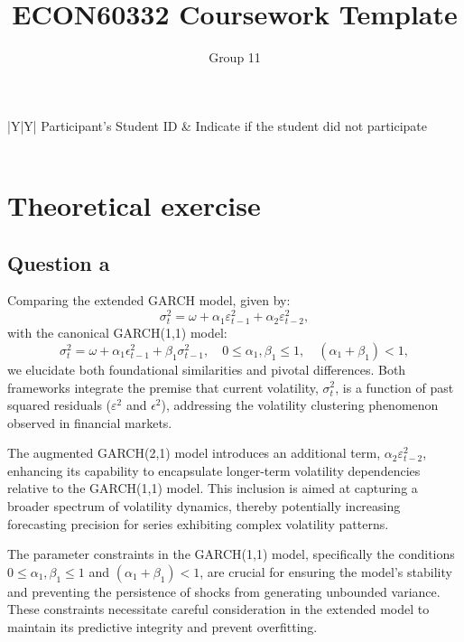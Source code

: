 \documentclass{article}
\title{ECON60332 Coursework Template}
\author{Group 11} %
\date{}
\begin{document}
\maketitle

\noindent\begin{tabularx}{\linewidth}{|Y|Y|}
    \hline
     Participant’s Student ID & Indicate if the student did not participate \\
    \hline
    \\
    \hline

\end{tabularx}

\section*{Theoretical exercise}

\subsection*{Question a}

Comparing the extended GARCH model, given by:
\begin{equation}
\sigma_t^2 = \omega + \alpha_1 \varepsilon_{t-1}^2 + \alpha_2 \varepsilon_{t-2}^2,
\end{equation}
with the canonical GARCH(1,1) model:
\begin{equation}
\sigma^2_{t} = \omega + \alpha_1 \epsilon^2_{t-1} + \beta_1 \sigma^2_{t-1}, \quad 0 \leq \alpha_1, \beta_1 \leq 1, \quad (\alpha_1 + \beta_1) < 1,
\end{equation}
we elucidate both foundational similarities and pivotal differences. Both frameworks integrate the premise that current volatility, $\sigma^2_{t}$, is a function of past squared residuals ($\varepsilon^2$ and $\epsilon^2$), addressing the volatility clustering phenomenon observed in financial markets.

The augmented GARCH(2,1) model introduces an additional term, $\alpha_2 \varepsilon_{t-2}^2$, enhancing its capability to encapsulate longer-term volatility dependencies relative to the GARCH(1,1) model. This inclusion is aimed at capturing a broader spectrum of volatility dynamics, thereby potentially increasing forecasting precision for series exhibiting complex volatility patterns.

The parameter constraints in the GARCH(1,1) model, specifically the conditions $0 \leq \alpha_1, \beta_1 \leq 1$ and $(\alpha_1 + \beta_1) < 1$, are crucial for ensuring the model's stability and preventing the persistence of shocks from generating unbounded variance. These constraints necessitate careful consideration in the extended model to maintain its predictive integrity and prevent overfitting.
\end{document}

